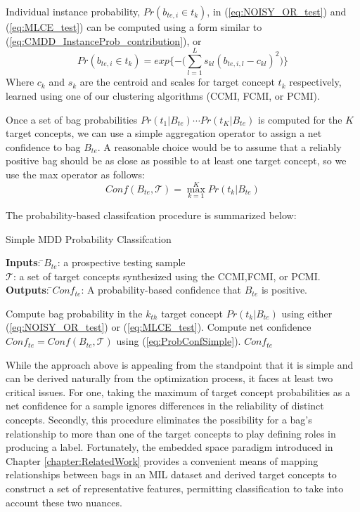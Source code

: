 \documentclass[12pt,dvips]{report}
\numberwithin{equation}{section}
\begin{document}
Individual instance probability, $Pr(b_{te,i}\!\in \!\!t_{k})$, in (\ref{eq:NOISY_OR_test}) and (\ref{eq:MLCE_test}) can be computed using a form similar to (\ref{eq:CMDD_InstanceProb_contribution}), or
\begin{equation} \label{eq:InstanceProb_test}
Pr(b_{te,i}\in t_{k})=exp\{-\big(\sum_{l=1}^{L}s_{kl}(b_{te,i,l}-c_{kl})^{2}\big)\}
\end{equation} Where $c_k$ and $s_k$ are the centroid and scales for target concept $t_k$ respectively, learned using one of our clustering algorithms (CCMI, FCMI, or PCMI).

Once a set of bag probabilities $Pr(t_1\vert B_{te}) \cdots Pr(t_K\vert B_{te})$ is computed for the $K$ target concepts, we can use a simple aggregation operator to assign a net confidence to bag $B_{te}$.  A reasonable choice would be to assume that a reliably positive bag should be as close as possible to at least one target concept, so we use the max operator as follows:
\begin{equation} \label{eq:ProbConfSimple}
Conf(B_{te}, \mathcal{T}) = \max_{k=1}^{K}Pr(t_{k}\vert B_{te})
\end{equation} 

The probability-based classifcation procedure is summarized below:

\begin{algorithm}
  \caption{Simple MDD Probability Classifcation}
  \label{alg:probsimple}
  {\begin{tabbing}
  \textbf{Inputs}: \=$B_{te}$: a prospective testing sample\\
   \>$\mathcal{T}$: a set of target concepts synthesized using the CCMI,FCMI, or PCMI.\\
   \textbf{Outputs}: \=$Conf_{te}$: A probability-based confidence that $B_{te}$ is positive.\\
   \end{tabbing}}
  \begin{algorithmic}
     \STATE Compute bag probability in the $k_{th}$ target concept $Pr(t_{k}\vert B_{te})$ using either (\ref{eq:NOISY_OR_test}) or (\ref{eq:MLCE_test}). \ENDFOR
    \STATE Compute net confidence $Conf_{te}=Conf(B_{te},\mathcal{T})$ using (\ref{eq:ProbConfSimple}).
    \RETURN $Conf_{te}$
  \end{algorithmic}
\end{algorithm}

While the approach above is appealing from the standpoint that it is simple and can be derived naturally from the optimization process, it faces at least two critical issues.  For one, taking the maximum of target concept probabilities as a net confidence for a sample ignores differences in the reliability of distinct concepts.  Secondly, this procedure eliminates the possibility for a bag's relationship to more than one of the target concepts to play defining roles in producing a label.  Fortunately, the embedded space paradigm introduced in Chapter \ref{chapter:RelatedWork} provides a convenient means of mapping relationships between bags in an MIL dataset and derived target concepts to construct a set of representative features, permitting classification to take into account these two nuances.
\end{document}
